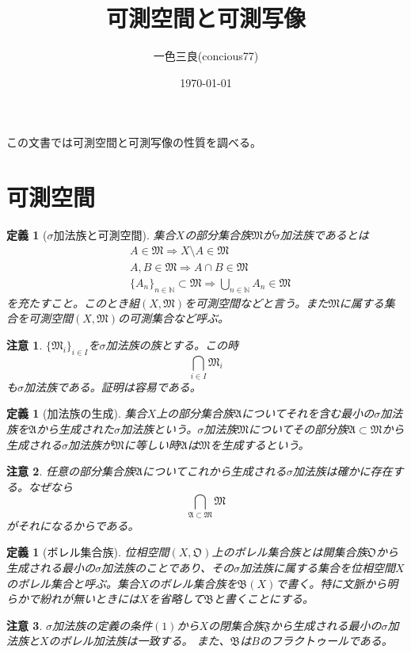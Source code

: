 \documentclass[leqno]{jsarticle}
\title{可測空間と可測写像}
\author{一色三良(concious77)}
\date{\today}
\newtheorem{df}[thm]{定義}
\newtheorem*{cau}{注意}
\newcommand{\To}{\Longrightarrow}
\newcommand{\nn}{\mathbb{N}}
\newcommand{\mm}{\mathfrak{M}}
\newcommand{\s}{\sigma}
\begin{document}
\maketitle

この文書では可測空間と可測写像の性質を調べる。
\section{可測空間}

\setcounter{equation}{0}
\begin{df}[$\sigma$加法族と可測空間]集合$X$の部分集合族$\mm$が$\sigma$加法族であるとは
\begin{eqnarray}
&A\in \mm \To X\setminus A\in \mm\\ 
&A,B\in\mm \To A\cap B\in \mm\\ 
&\{A_n\}_{n\in \nn}\subset \mm \To \bigcup_{n\in\nn}A_n\in \mm 
\end{eqnarray}
を充たすこと。このとき組$(X,\mm)$を可測空間などと言う。また$\mm$に属する集合を可測空間$(X,\mm)$の可測集合など呼ぶ。
\end{df}
\begin{cau}
$\{\mm_i\}_{i\in I}$を$\s$加法族の族とする。この時
\[
\bigcap_{i\in I}\mm_i
\]
も$\s$加法族である。証明は容易である。
\end{cau}
\begin{df}[加法族の生成]集合$X$上の部分集合族$\mathfrak{A}$についてそれを含む最小の$\s$加法族を$\mathfrak{A}$から生成された$\s$加法族という。$\s$加法族$\mm$についてその部分族$\mathfrak{A}\subset \mm$から生成される$\s$加法族が$\mm$に等しい時$\mathfrak{A}$は$\mm$を生成するという。
\end{df}
\begin{cau}任意の部分集合族$\mathfrak{A}$についてこれから生成される$\s$加法族は確かに存在する。なぜなら
\[
\bigcap_{\mathfrak{A}\subset \mm}\mm
\]
がそれになるからである。
\end{cau}


\begin{df}[ボレル集合族]位相空間$(X,\mathfrak{O})$上のボレル集合族とは開集合族$\mathfrak{O}$から生成される最小の$\sigma$加法族のことであり、その$\sigma$加法族に属する集合を位相空間$X$のボレル集合と呼ぶ。集合$X$のボレル集合族を$\mathfrak{B}(X)$で書く。特に文脈から明らかで紛れが無いときには$X$を省略して$\mathfrak{B}$と書くことにする。
\end{df}
\begin{cau}$\sigma$加法族の定義の条件$(1)$から$X$の閉集合族$\mathfrak{F}$から生成される最小の$\sigma$加法族と$X$のボレル加法族は一致する。
また、$\mathfrak{B}$は$B$のフラクトゥールである。
\end{cau}
\end{document}
